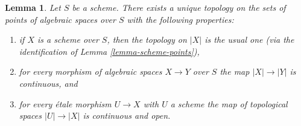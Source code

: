 \documentclass[10pt,a4paper]{amsart}
\theoremstyle{plain}
\newtheorem{lemma}[subsection]{Lemma}
\theoremstyle{definition}
\theoremstyle{remark}
\numberwithin{equation}{subsection}
\begin{document}
\begin{lemma}
\label{lemma-topology-points}
Let $S$ be a scheme. There exists a unique topology on the sets of points
of algebraic spaces over $S$ with the following properties:
\begin{enumerate}
\item if $X$ is a scheme over $S$, then the topology on $|X|$ is the usual one
(via the identification of Lemma \ref{lemma-scheme-points}),
\item for every morphism of algebraic spaces $X \to Y$ over $S$
the map $|X| \to |Y|$ is continuous, and
\item for every \'etale morphism $U \to X$ with $U$ a scheme
the map of topological spaces $|U| \to |X|$ is continuous and open.
\end{enumerate}
\end{lemma}
\end{document}
